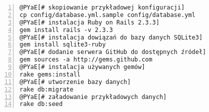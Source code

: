 \begin{Verbatim}[commandchars=@\[\],numbers=left,firstnumber=1,stepnumber=1]
@PYaE[# skopiowanie przykładowej konfiguracji]
cp config/database.yml.sample config/database.yml
@PYaE[# instalacja Ruby on Rails 2.3.3]
gem install rails -v 2.3.3
@PYaE[# instalacja dowiązań do bazy danych SQLite3]
gem install sqlite3-ruby
@PYaE[# dodanie serwera GitHub do dostępnych źródeł]
gem sources -a http://gems.github.com
@PYaE[# instalacja używanych gemów]
rake gems:install
@PYaE[# utworzenie bazy danych]
rake db:migrate
@PYaE[# załadowanie przykładowych danych]
rake db:seed
\end{Verbatim}
